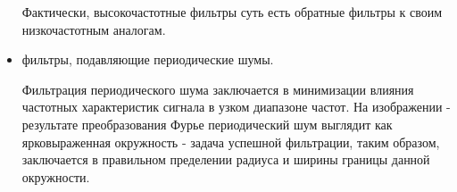 \begin{itemize}
	Фактически, высокочастотные фильтры суть есть обратные фильтры к своим низкочастотным аналогам.

\noindent
{}
\mimageend

\noindent
{}
\mimageend

\noindent
{}
\mimageend

	\item фильтры, подавляющие периодические шумы.

	Фильтрация периодического шума заключается в минимизации влияния частотных характеристик сигнала в узком диапазоне частот. На изображении - результате преобразования Фурье периодический шум выглядит как ярковыраженная окружность - задача успешной фильтрации, таким образом, заключается в правильном пределении радиуса и ширины границы данной окружности.


\end{itemize}
